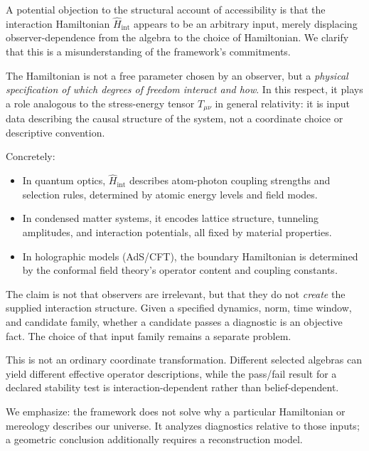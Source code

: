 \documentclass[12pt,a4paper]{article}
\begin{document}
\begin{tcolorbox}[colback=gray!5!white,colframe=black!75!black,title=\textbf{Remark: The Hamiltonian as Physical Input}]
A potential objection to the structural account of accessibility is that the interaction Hamiltonian $\hat{H}_{\text{int}}$ appears to be an arbitrary input, merely displacing observer-dependence from the algebra to the choice of Hamiltonian. We clarify that this is a misunderstanding of the framework's commitments.

The Hamiltonian is not a free parameter chosen by an observer, but a \emph{physical specification of which degrees of freedom interact and how}. In this respect, it plays a role analogous to the stress-energy tensor $T_{\mu\nu}$ in general relativity: it is input data describing the causal structure of the system, not a coordinate choice or descriptive convention.

Concretely:
\begin{itemize}
\item In quantum optics, $\hat{H}_{\text{int}}$ describes atom-photon coupling strengths and selection rules, determined by atomic energy levels and field modes.
\item In condensed matter systems, it encodes lattice structure, tunneling amplitudes, and interaction potentials, all fixed by material properties.
\item In holographic models (AdS/CFT), the boundary Hamiltonian is determined by the conformal field theory's operator content and coupling constants.
\end{itemize}

The claim is not that observers are irrelevant, but that they do not \emph{create} the supplied interaction structure.  Given a specified dynamics, norm, time window, and candidate family, whether a candidate passes a diagnostic is an objective fact.  The choice of that input family remains a separate problem.

This is not an ordinary coordinate transformation.  Different selected algebras can yield different effective operator descriptions, while the pass/fail result for a declared stability test is interaction-dependent rather than belief-dependent.

We emphasize: the framework does not solve why a particular Hamiltonian or mereology describes our universe.  It analyzes diagnostics relative to those inputs; a geometric conclusion additionally requires a reconstruction model.
\end{tcolorbox}
\end{document}
